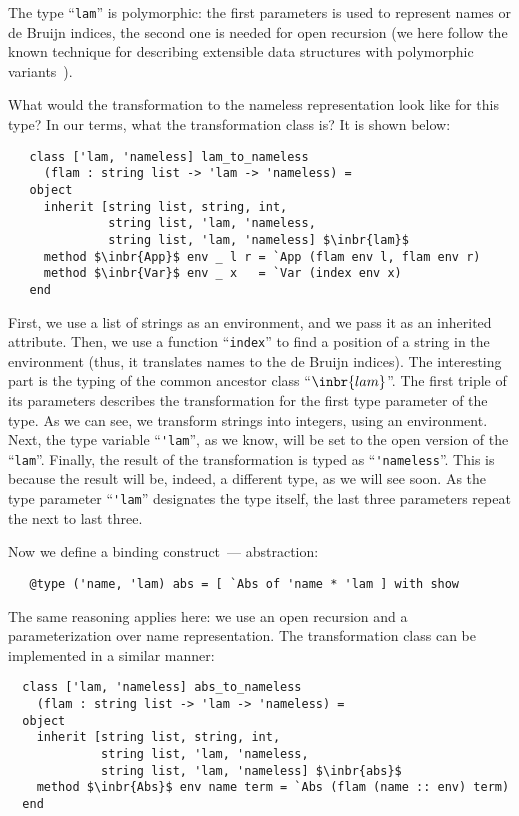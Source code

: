 The type ``\lstinline{lam}'' is polymorphic: the first parameters is used to represent names or de Bruijn indices, the second one is needed
for open recursion (we here follow the known technique for describing extensible data structures with polymorphic variants~\cite{PolyVarReuse}).

What would the transformation to the nameless representation look like for this type? In our terms, what the transformation class is? It is shown
below:

\begin{lstlisting}
   class ['lam, 'nameless] lam_to_nameless
     (flam : string list -> 'lam -> 'nameless) =
   object
     inherit [string list, string, int,
              string list, 'lam, 'nameless,
              string list, 'lam, 'nameless] $\inbr{lam}$
     method $\inbr{App}$ env _ l r = `App (flam env l, flam env r)
     method $\inbr{Var}$ env _ x   = `Var (index env x)
   end
\end{lstlisting}

First, we use a list of strings as an environment, and we pass it as an inherited attribute. Then, we use a function ``\lstinline{index}'' to find a
position of a string in the environment (thus, it translates names to the de Bruijn indices). The interesting part is the typing of the common ancestor
class ``$\inbr{lam}$''. The first triple of its parameters describes the transformation for the first type parameter of the type. As we can see, we
transform strings into integers, using an environment. Next, the type variable ``\lstinline{'lam}'', as we know, will be set to the open version of the ``\lstinline{lam}''.
Finally, the result of the transformation is typed as ``\lstinline{'nameless}''. This is because the result will be, indeed, a different type, as we
will see soon. As the type parameter ``\lstinline{'lam}'' designates the type itself, the last three parameters repeat the next to last three.

Now we define a binding construct~--- abstraction:

\begin{lstlisting}
   @type ('name, 'lam) abs = [ `Abs of 'name * 'lam ] with show
\end{lstlisting}

The same reasoning applies here: we use an open recursion and a parameterization over name representation. The transformation class can be
implemented in a similar manner:

\begin{lstlisting}
  class ['lam, 'nameless] abs_to_nameless
    (flam : string list -> 'lam -> 'nameless) =
  object
    inherit [string list, string, int,
             string list, 'lam, 'nameless,
             string list, 'lam, 'nameless] $\inbr{abs}$
    method $\inbr{Abs}$ env name term = `Abs (flam (name :: env) term)
  end
\end{lstlisting}

